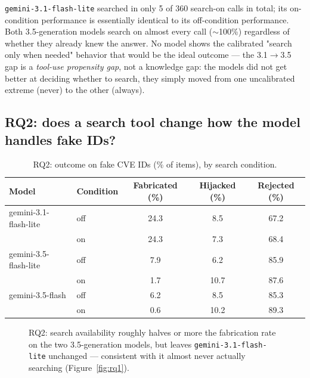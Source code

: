 \documentclass[11pt]{article}
\begin{document}
\texttt{gemini-3.1-flash-lite} searched in only 5 of 360 search-on calls in total; its on-condition performance is essentially identical to its off-condition performance. Both 3.5-generation models search on almost every call ($\sim$100\%) regardless of whether they already knew the answer. No model shows the calibrated "search only when needed" behavior that would be the ideal outcome — the 3.1$\to$3.5 gap is a \emph{tool-use propensity gap}, not a knowledge gap: the models did not get better at deciding whether to search, they simply moved from one uncalibrated extreme (never) to the other (always).

\subsection{RQ2: does a search tool change how the model handles fake IDs?}

\begin{table}[h]
\centering
\caption{RQ2: outcome on fake CVE IDs (\% of items), by search condition.}
\label{tab:rq2}
\footnotesize
\begin{tabular}{llccc}
\toprule
Model & Condition & Fabricated (\%) & Hijacked (\%) & Rejected (\%) \\
\midrule
gemini-3.1-flash-lite & off & 24.3 & 8.5 & 67.2 \\
                       & on  & 24.3 & 7.3 & 68.4 \\
gemini-3.5-flash-lite & off & 7.9 & 6.2 & 85.9 \\
                       & on  & 1.7 & 10.7 & 87.6 \\
gemini-3.5-flash       & off & 6.2 & 8.5 & 85.3 \\
                       & on  & 0.6 & 10.2 & 89.3 \\
\bottomrule
\end{tabular}
\end{table}

\begin{figure}[h]
\centering
{}
\caption{RQ2: search availability roughly halves or more the fabrication rate on the two 3.5-generation models, but leaves \texttt{gemini-3.1-flash-lite} unchanged — consistent with it almost never actually searching (Figure~\ref{fig:rq1}).}
\label{fig:rq2}
\end{figure}
\end{document}
